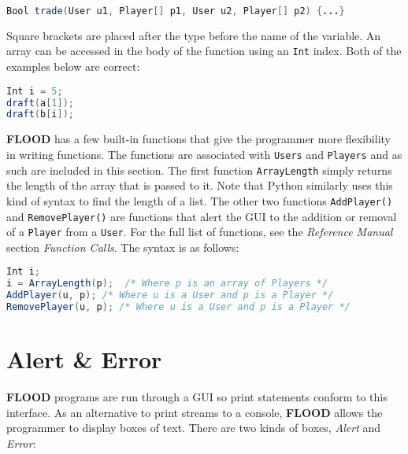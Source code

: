 \documentclass[12pt]{report}
\begin{document}
\begin{singlespace}
\begin{lstlisting}[language=Java,label=some-code,caption=Passing User and Player arrays]
Bool trade(User u1, Player[] p1, User u2, Player[] p2) {...}
\end{lstlisting}
\end{singlespace}

Square brackets are placed after the type before the name of the variable. An array can be accessed in the body of the function using an \texttt{Int} index. Both of the examples below are correct:

\begin{singlespace}
\begin{lstlisting}[language=Java,label=some-code,caption=Assessing array elements using index]
Int i = 5;
draft(a[1]);
draft(b[i]);
\end{lstlisting}
\end{singlespace}

\textbf{FLOOD} has a few built-in functions that give the programmer more flexibility in writing functions. The functions are associated with \texttt{Users} and \texttt{Players} and as such are included in this section. The first function \texttt{ArrayLength} simply returns the length of the array that is passed to it. Note that Python similarly uses this kind of syntax to find the length of a list. The other two functions \texttt{AddPlayer()} and \texttt{RemovePlayer()} are functions that alert the GUI to the addition or removal of a \texttt{Player} from a \texttt{User}. For the full list of functions, see the \textit{Reference Manual} section \textit{Function Calls}. The syntax is as follows:

\begin{singlespace}
\begin{lstlisting}[language=Java,label=some-code,caption=Some FLOOD utility functions and usage]
Int i;
i = ArrayLength(p);  /* Where p is an array of Players */
AddPlayer(u, p); /* Where u is a User and p is a Player */
RemovePlayer(u, p); /* Where u is a User and p is a Player */
\end{lstlisting}
\end{singlespace}

\section{Alert \& Error}

\textbf{FLOOD} programs are run through a GUI so print statements conform to this interface. As an alternative to print streams to a console, \textbf{FLOOD} allows the programmer to display boxes of text. There are two kinds of boxes, \textit{Alert} and \textit{Error}:
\end{document}
